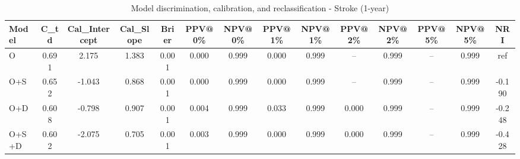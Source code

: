\begin{table}[htbp]
\centering
\small
\caption{Model discrimination, calibration, and reclassification - Stroke (1-year)}
\label{tab:perf_stroke_1y}
\begin{tabular}{lccccccccccccc}
\toprule
Model & C\_td & Cal\_Intercept & Cal\_Slope & Brier & PPV@0\% & NPV@0\% & PPV@1\% & NPV@1\% & PPV@2\% & NPV@2\% & PPV@5\% & NPV@5\% & NRI \\
\midrule
O & 0.691 & 2.175 & 1.383 & 0.001 & 0.000 & 0.999 & 0.000 & 0.999 & -- & 0.999 & -- & 0.999 & ref \\
O+S & 0.652 & -1.043 & 0.868 & 0.001 & 0.000 & 0.999 & 0.000 & 0.999 & -- & 0.999 & -- & 0.999 & -0.190 \\
O+D & 0.608 & -0.798 & 0.907 & 0.001 & 0.004 & 0.999 & 0.033 & 0.999 & 0.000 & 0.999 & -- & 0.999 & -0.248 \\
O+S+D & 0.602 & -2.075 & 0.705 & 0.001 & 0.003 & 0.999 & 0.000 & 0.999 & 0.000 & 0.999 & -- & 0.999 & -0.428 \\
\bottomrule
\end{tabular}
\end{table}